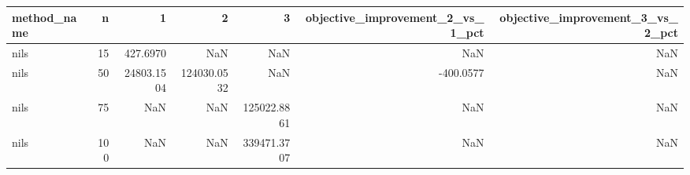 \begin{tabular}{lrrrrrr}
\toprule
method_name & n & 1 & 2 & 3 & objective_improvement_2_vs_1_pct & objective_improvement_3_vs_2_pct \\
\midrule
nils & 15 & 427.6970 & NaN & NaN & NaN & NaN \\
nils & 50 & 24803.1504 & 124030.0532 & NaN & -400.0577 & NaN \\
nils & 75 & NaN & NaN & 125022.8861 & NaN & NaN \\
nils & 100 & NaN & NaN & 339471.3707 & NaN & NaN \\
\bottomrule
\end{tabular}
